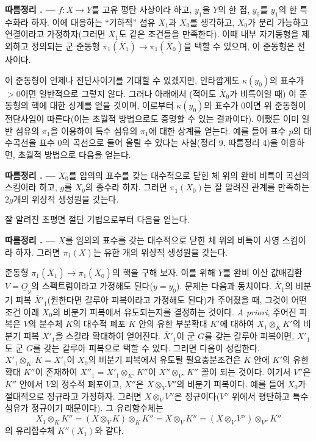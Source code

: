 \documentclass[11pt,twoside,openany]{book}
\numberwithin{equation}{section}
\newcommand{\sourceunit}{front}
\newcommand{\src}[1]{%
  \phantomsection\hypertarget{src:\sourceunit:#1}{}%
  \marginpar{\raggedleft\footnotesize\sffamily #1}%
}
\newcommand{\Osh}{\underline{O}}
\theoremstyle{plain}
\theoremstyle{definition}
\theoremstyle{remark}
\newcommand{\result}[2]{%
  \par\medskip\noindent\textbf{#1%
  \if\relax\detokenize{#2}\relax\else\space#2\fi. ---}\enspace
}
\begin{document}
\result{따름정리}{2} $f:X\longrightarrow Y$를 고유 평탄 사상이라 하고,
$y_1$을 $Y$의 한 점, $y_0$를 $y_1$의 한 특수화라 하자. 이에 대응하는
``기하적'' 섬유 $\overline X_1$과 $\overline X_0$를 생각하고,
$\overline X_0$가 분리 가능하고 연결이라고 가정하자(그러면
$\overline X_1$도 같은 조건들을 만족한다). 이때 내부 자기동형을 제외하고
정의되는 군 준동형
$\pi_1(\overline X_1)\longrightarrow\pi_1(\overline X_0)$을 택할 수 있으며,
이 준동형은 전사이다.

\src{217}
이 준동형이 언제나 전단사이기를 기대할 수 있겠지만, 안타깝게도
$\kappa(y_0)$의 표수가 $>0$이면 일반적으로 그렇지 않다. 그러나 아래에서
(적어도 $\overline X_0$가 비특이일 때) 이 준동형의 핵에 대한 상계를 얻을
것이며, 이로부터 $\kappa(y_0)$의 표수가 $0$이면 위 준동형이 전단사임이
따른다(이는 초월적 방법으로도 증명할 수 있는 결과이다). 어쨌든 이미
일반 섬유의 $\pi_1$을 이용하여 특수 섬유의 $\pi_1$에 대한 상계를 얻는다.
예를 들어 표수 $p$의 대수곡선을 표수 $0$의 곡선으로 들어 올릴 수 있다는
사실(정리 9, 따름정리 4)을 이용하면, 초월적 방법으로 다음을 얻는다.

\result{따름정리}{3} $X_0$를 임의의 표수를 갖는 대수적으로 닫힌 체 위의
완비 비특이 곡선의 스킴이라 하고, $g$를 $X_0$의 종수라 하자. 그러면
$\pi_1(X_0)$는 잘 알려진 관계를 만족하는 $2g$개의 위상적 생성원을 갖는다.

잘 알려진 초평면 절단 기법으로부터 다음을 얻는다.

\result{따름정리}{4} $X$를 임의의 표수를 갖는 대수적으로 닫힌 체 위의
비특이 사영 스킴이라 하자. 그러면 $\pi_1(X)$는 유한 개의 위상적 생성원을
갖는다.

준동형 $\pi_1(\overline X_1)\longrightarrow\pi_1(\overline X_0)$의 핵을
구해 보자. 이를 위해 $Y$를 완비 이산 값매김환 $V=\Osh_y$의 스펙트럼이라고
가정해도 된다($y=y_0$). 문제는 다음과 동치이다. $\overline X_1$의 비분기
피복 $\overline X'_1$(원한다면 갈루아 피복이라고 가정해도 된다)가 주어졌을
때, 그것이 어떤 조건 아래 $X_0$의 비분기 피복에서 유도되는지를 결정하는
것이다. \textit{A priori}, 주어진 피복은 $V$의 분수체 $K$의 대수적 폐포
$\overline K$ 안의 유한 부분확대 $K'$에 대하여
$X_1\otimes_K K'$의 비분기 피복 $X'_1$을 스칼라 확대하여 얻어진다.
$\overline X'_1$이 군 $G$를 갖는 갈루아 피복이면, $X'_1$도 군 $G$를 갖는
갈루아 피복으로 택할 수 있다. 그러면 다음이 성립한다.
$X'_1\otimes_{K'}\overline K=\overline X'_1$이 $X_0$의 비분기 피복에서
유도될 필요충분조건은 $\overline K$ 안에 $K'$의 유한 확대 $K''$이 존재하여
$X''_1=X'_1\otimes_{K'}K''$이 $X''\otimes_{V''}K''$ 꼴이 되는 것이다.
여기서 $V''$은 $K''$ 안에서 $V$의 정수적 폐포이고, $X''$은
$X\otimes_VV''$의 비분기 피복이다. 예를 들어 $X_0$가 절대적으로
정규라고 가정하자. 그러면 $X\otimes_VV''$은 정규이다($V''$ 위에서
평탄하고 특수 섬유가 정규이기 때문이다). 그 유리함수체는
\[
  X_1\otimes_KK''
  =(X\otimes_VK)\otimes_KK''
  =X\otimes_VK''
  =(X\otimes_VV'')\otimes_{V''}K''
\]
의 유리함수체 $K''(X_1)$와 같다.
\end{document}
